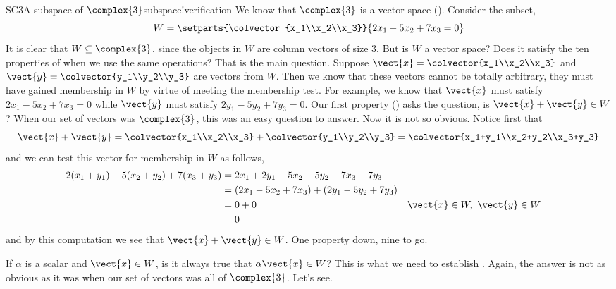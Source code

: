 \begin{example}{SC3}{A subspace of $\complex{3}$}{subspace!verification}
We know that $\complex{3}$ is a vector space ().  Consider the subset,
%
\begin{equation*}
W=\setparts{\colvector{x_1\\x_2\\x_3}}{2x_1-5x_2+7x_3=0}
\end{equation*}
%
It is clear that $W\subseteq\complex{3}$, since the objects in $W$ are column vectors of size 3.  But is $W$ a vector space?  Does it satisfy the ten properties of  when we use the same operations?  That is the main question.
%
Suppose $\vect{x}=\colvector{x_1\\x_2\\x_3}$ and $\vect{y}=\colvector{y_1\\y_2\\y_3}$ are vectors from $W$.  Then we know that these vectors cannot be totally arbitrary, they must have gained membership in $W$ by virtue of meeting the membership test.  For example, we know that $\vect{x}$ must satisfy $2x_1-5x_2+7x_3=0$ while $\vect{y}$ must satisfy $2y_1-5y_2+7y_3=0$.  Our first property () asks the question, is $\vect{x}+\vect{y}\in W$?  When our set of vectors was $\complex{3}$, this was an easy question to answer.  Now it is not so obvious.  Notice first that
%
\begin{equation*}
\vect{x}+\vect{y}=\colvector{x_1\\x_2\\x_3}+\colvector{y_1\\y_2\\y_3}=
\colvector{x_1+y_1\\x_2+y_2\\x_3+y_3}
\end{equation*}
%
and we can test this vector for membership in $W$ as follows,
\begin{align*}
2(x_1+y_1)-5(x_2+y_2)+7(x_3+y_3)
&=2x_1+2y_1-5x_2-5y_2+7x_3+7y_3\\
&=(2x_1-5x_2+7x_3)+(2y_1-5y_2+7y_3)\\
&=0 + 0&&\vect{x}\in W,\ \vect{y}\in W\\
&=0
\end{align*}
%
and by this computation we see that $\vect{x}+\vect{y}\in W$.  One property down, nine to go.\par
%
If $\alpha$ is a scalar and $\vect{x}\in W$, is it always true that $\alpha\vect{x}\in W$?  This is what we need to establish .  Again, the answer is not as obvious as it was when our set of vectors was all of $\complex{3}$.  Let's see.

\end{example}
